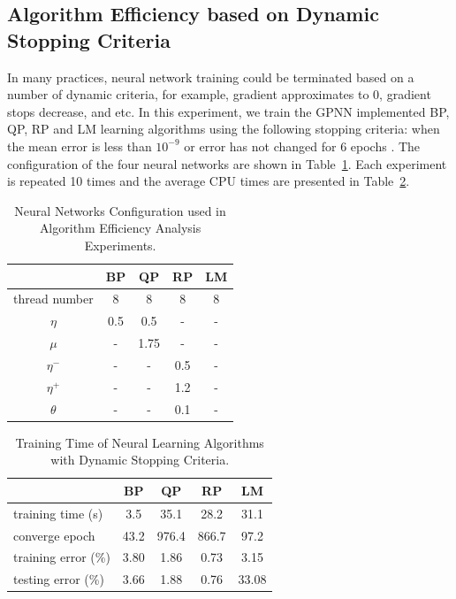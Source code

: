 \documentclass[procedia]{easychair}
\begin{document}
\subsection{Algorithm Efficiency based on Dynamic Stopping Criteria}

In many practices, neural network training could be terminated based on a number of dynamic criteria, for example, gradient approximates to 0, gradient stops decrease, and etc.  In this experiment, we train the GPNN implemented BP, QP, RP and LM learning algorithms using the following stopping criteria: when the mean error is less than $ 10 ^ {-9} $ or error has not changed for 6 epochs \cite{matlab:neural_networks}.  The configuration of the four neural networks are shown in Table~\ref{table:config_algorithm_efficiency}.  Each experiment is repeated 10 times and the average CPU times are presented in Table~\ref{table:algorithm_efficiency}.

\begin{table}[htp]
    \centering
    \caption{Neural Networks Configuration used in Algorithm Efficiency Analysis Experiments.}
    \begin{tabular}{ c c c c c }
        \hline \hline
        & BP & QP & RP & LM \\
        \hline
        thread number & 8 & 8 & 8 & 8 \\
        $\eta$ & 0.5 & 0.5 & - & - \\
        $\mu$ & - & 1.75 & - & - \\
        $\eta ^ -$ & - & - & 0.5 & - \\
        $\eta ^ +$ & - & - & 1.2 & - \\
        $\theta$ & - & - & 0.1 & - \\
        \hline \hline
    \end{tabular}
    \label{table:config_algorithm_efficiency}
\end{table}

\begin{table}[htp]
    \centering
    \caption{Training Time of Neural Learning Algorithms with Dynamic Stopping Criteria.}
    \begin{tabular}{ l c c c c }
        \hline \hline
        & BP & QP & RP & LM \\
        \hline
        training time (s) & 3.5 & 35.1 & 28.2 & 31.1 \\
        converge epoch & 43.2 & 976.4 & 866.7 & 97.2 \\
        training error (\%) & 3.80 & 1.86 & 0.73 & 3.15 \\
        testing error (\%) & 3.66 & 1.88 & 0.76 & 33.08 \\
        \hline \hline
    \end{tabular}
    \label{table:algorithm_efficiency}
\end{table}
\end{document}
